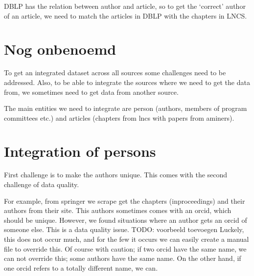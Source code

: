 \documentclass{ou-report}
\newcommand{\todo}[1]{{\color{red} TODO: #1}}
\begin{document}
DBLP has the relation between author and article, so to get the `correct' author
of an article, we need to match the articles in DBLP with the chapters in LNCS.






\section{Nog onbenoemd}


To get an integrated dataset across all sources some challenges need to be 
addressed. Also, to be able to integrate the sources where we need to get the
data from, we sometimes need to get data from another source.

The main entities we need to integrate are person (authors, members of program
committees etc.) and articles (chapters from lncs with papers from aminers).

\section{Integration of persons}

First challenge is to make the authors unique. This comes with the
second challenge of data quality.

For example, from springer we scrape get the chapters (inproceedings) and their 
authors from their site. This authors sometimes comes with an orcid, which 
should be unique. However, we found situations where an author gets an orcid of
someone else. This is a data quality issue.
\todo{voorbeeld toevoegen}
Luckely, this does not occur much, and for the few it occurs we can easily 
create a manual file to override this. Of course with caution; if two orcid 
have the same name, we can not override this; some authors have the same name.
On the other hand, if one orcid refers to a totally different name, we can.
\end{document}
